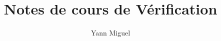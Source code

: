 \documentclass[a4paper, 12pt]{article}
\title{Notes de cours de V\'erification}
\author{Yann Miguel}
\begin{document}
\ttfamily
\maketitle
\tableofcontents
\newpage




\end{document}
